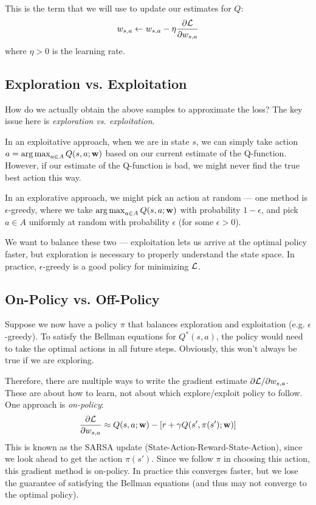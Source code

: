 \documentclass[12pt]{article}
\begin{document}
This is the term that we will use to update our estimates for $Q$:
\begin{align}
w_{s,a} \leftarrow w_{s,a} - \eta\frac{\partial \mathcal{L}}{\partial w_{s,a}}
\end{align}
where $\eta>0$ is the learning rate.

\subsection{Exploration vs. Exploitation}

How do we actually obtain the above samples to approximate the loss? The key issue here is \emph{exploration vs. exploitation}.

In an exploitative approach, when we are in state $s$, we can simply take action $a = \argmax_{a \in A} Q(s,a;\boldw)$ based on our current estimate of the Q-function. However, if our estimate of the Q-function is bad, we might never find the true best action this way.

In an explorative approach, we might pick an action at random --- one method is $\epsilon$-greedy, where we take $\argmax_{a \in A} Q(s,a;\boldw)$ with probability $1-\epsilon$, and pick $a \in A$ uniformly at random with probability $\epsilon$ (for some $\epsilon>0$).

We want to balance these two --- exploitation lets us arrive at the optimal policy faster, but exploration is necessary to properly understand the state space. In practice, $\epsilon$-greedy is a good policy for minimizing $\mathcal{L}$.

\subsection{On-Policy vs. Off-Policy}

Suppose we now have a policy $\pi$ that balances exploration and exploitation (e.g. $\epsilon$-greedy). To satisfy the Bellman equations for $Q^*(s,a)$, 
the policy would need to take the optimal actions in all future steps. Obviously, this won't always be true if we are exploring.

Therefore, there are multiple ways to write the gradient estimate $\partial \mathcal{L} / \partial w_{s,a}$. These are about how to learn, not about which explore/exploit policy to follow. One approach is \emph{on-policy}:
\begin{equation}
\frac{\partial \mathcal{L}}{\partial w_{s,a}} \approx Q(s,a;\mathbf{w}) - [r + \gamma Q(s', \pi(s'); \mathbf{w})]
\end{equation}
This is known as the SARSA update (State-Action-Reward-State-Action), since we look ahead to get the action $\pi(s')$. Since we follow $\pi$ in choosing this action, this gradient method is on-policy. In practice this converges faster, but we lose the guarantee of satisfying the Bellman equations (and thus may not converge to the optimal
policy).
\end{document}
